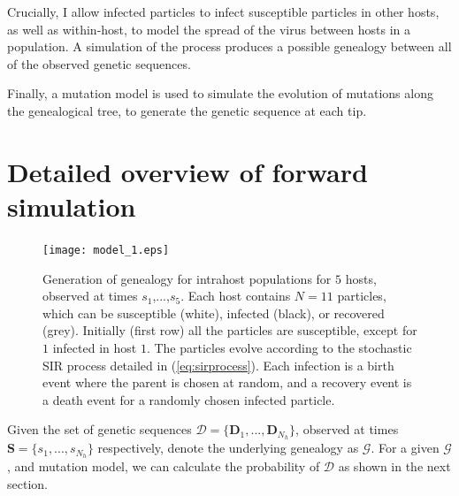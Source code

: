\documentclass[a4paper,18pt]{report}
\begin{document}
Crucially, I allow infected particles to infect susceptible particles in other hosts, as well as within-host, to model the spread of the virus between hosts in a population. A simulation of the process produces a possible genealogy between all of the observed genetic sequences.

Finally, a mutation model is used to simulate the evolution of mutations along the genealogical tree, to generate the genetic sequence at each tip.

\section{Detailed overview of forward simulation} 

\begin{figure}[h]
\centering
\texttt{[image: model\_1.eps]}
\caption{Generation of genealogy for intrahost populations for $5$ hosts, observed at times $s_1$,...,$s_5$. Each host contains $N=11$ particles, which can be susceptible (white), infected (black), or recovered (grey). Initially (first row) all the particles are susceptible, except for $1$ infected in host $1$. The particles evolve according to the stochastic SIR process detailed in (\ref{eq:sirprocess}). Each infection is a birth event where the parent is chosen at random, and a recovery event is a death event for a randomly chosen infected particle.
}\end{figure}
Given the set of genetic sequences $\mathcal{D} = \{\mathbf{D}_1,...,\mathbf{D}_{N_h}\}$, observed at times $\mathbf{S} = \{s_1,...,s_{N_h}\}$ respectively, denote the underlying genealogy as $\mathcal{G}$. 
For a given $\mathcal{G}$, and mutation model, we can calculate the probability of $\mathcal{D}$ as shown in the next section. 
\end{document}
